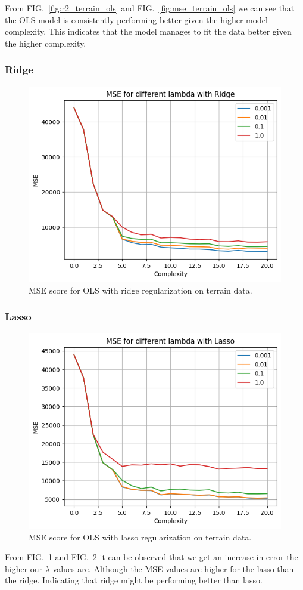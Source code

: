 \documentclass[aps,rmp,reprint,amsmath,amssymb,graphicx,longbibliography]{revtex4-1}
\begin{document}
From FIG.~\ref{fig:r2_terrain_ols} and FIG.~\ref{fig:mse_terrain_ols} we can see that the OLS model is consistently performing better given the higher model complexity. This indicates that the model manages to fit the data better given the higher complexity.

\subsubsection{Ridge}
\begin{figure}[H]
    \centering
    \includegraphics[width=0.6\linewidth]{Project_1/figures/MSE_ridge_terrain.png}
    \caption{MSE score for OLS with ridge regularization on terrain data.}
    \label{fig:mse_terrain_ridge}
\end{figure}

\subsubsection{Lasso}
\begin{figure}[H]
    \centering
    \includegraphics[width=0.6\linewidth]{Project_1/figures/MSE_lasso_terrain.png}
    \caption{MSE score for OLS with lasso regularization on terrain data.}
    \label{fig:mse_terrain_lasso}
\end{figure}

From FIG.~\ref{fig:mse_terrain_ridge} and FIG.~\ref{fig:mse_terrain_lasso} it can be observed that we get an increase in error the higher our $\lambda$ values are. Although the MSE values are higher for the lasso than the ridge. Indicating that ridge might be performing better than lasso.
\end{document}
